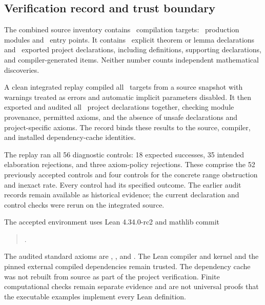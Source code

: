 \subsection{Verification record and trust boundary}
The combined source inventory contains \EditionTargets\ compilation targets: \EditionProductionModules\ production modules and \EditionRoots\ entry points. It contains \EditionTheorems\ explicit theorem or lemma declarations and \EditionDeclarations\ exported project declarations, including definitions, supporting declarations, and compiler-generated items. Neither number counts independent mathematical discoveries.

A clean integrated replay compiled all \EditionTargets\ targets from a source snapshot with warnings treated as errors and automatic implicit parameters disabled. It then exported and audited all \EditionDeclarations\ project declarations together, checking module provenance, permitted axioms, and the absence of unsafe declarations and project-specific axioms. The record binds these results to the source, compiler, and installed dependency-cache identities.

The replay ran all 56 diagnostic controls: 18 expected successes, 35 intended elaboration rejections, and three axiom-policy rejections. These comprise the 52 previously accepted controls and four controls for the concrete range obstruction and inexact rate. Every control had its specified outcome. The earlier audit records remain available as historical evidence; the current declaration and control checks were rerun on the integrated source.

The accepted environment uses Lean 4.34.0-rc2 and mathlib commit
\begin{quote}\small{}.\end{quote}
The audited standard axioms are , , and . The Lean compiler and kernel and the pinned external compiled dependencies remain trusted. The dependency cache was not rebuilt from source as part of the project verification. Finite computational checks remain separate evidence and are not universal proofs that the executable examples implement every Lean definition.
